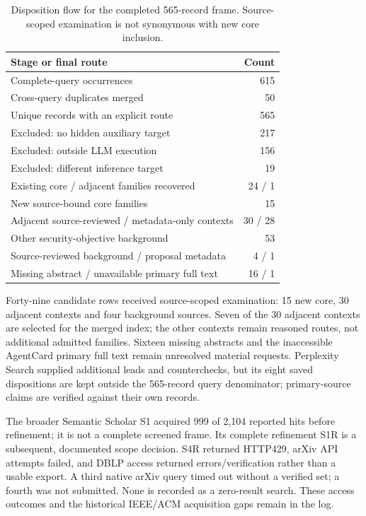 \begin{table}[!ht]\centering\footnotesize
\caption{Disposition flow for the completed 565-record frame. Source-scoped examination is not synonymous with new core inclusion.}\label{tab:finite-flow}
\begin{tabularx}{\columnwidth}{@{}Yr@{}}\toprule
Stage or final route & Count\\\midrule
Complete-query occurrences & 615\\
Cross-query duplicates merged & 50\\
Unique records with an explicit route & 565\\\midrule
Excluded: no hidden auxiliary target & 217\\
Excluded: outside LLM execution & 156\\
Excluded: different inference target & 19\\
Existing core / adjacent families recovered & 24 / 1\\
New source-bound core families & 15\\
Adjacent source-reviewed / metadata-only contexts & 30 / 28\\
Other security-objective background & 53\\
Source-reviewed background / proposal metadata & 4 / 1\\
Missing abstract / unavailable primary full text & 16 / 1\\\bottomrule
\end{tabularx}\end{table}

Forty-nine candidate rows received source-scoped examination: 15 new core, 30 adjacent contexts and four background sources. Seven of the 30 adjacent contexts are selected for the merged index; the other contexts remain reasoned routes, not additional admitted families. Sixteen missing abstracts and the inaccessible AgentCard primary full text remain unresolved material requests. Perplexity Search supplied additional leads and counterchecks, but its eight saved dispositions are kept outside the 565-record query denominator; primary-source claims are verified against their own records.

The broader Semantic Scholar S1 acquired 999 of 2,104 reported hits before refinement; it is not a complete screened frame. Its complete refinement S1R is a subsequent, documented scope decision. S4R returned HTTP429, arXiv API attempts failed, and DBLP access returned errors/verification rather than a usable export. A third native arXiv query timed out without a verified set; a fourth was not submitted. None is recorded as a zero-result search. These access outcomes and the historical IEEE/ACM acquisition gaps remain in the log.

